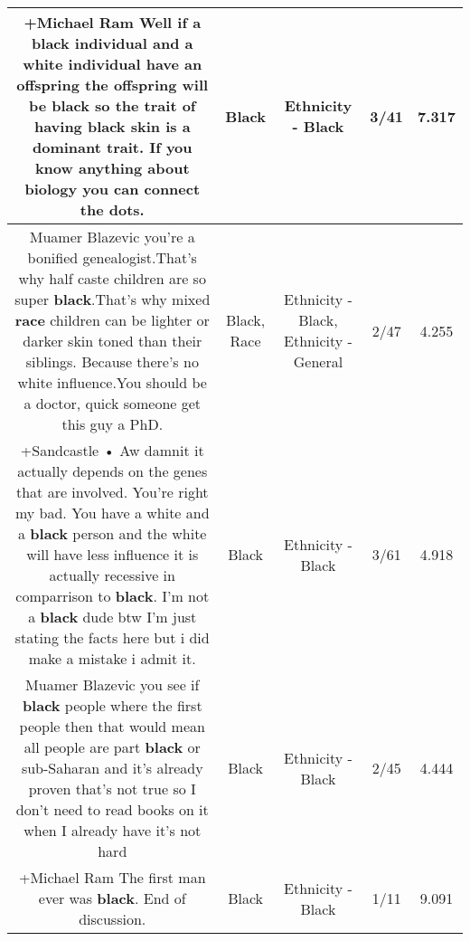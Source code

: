 \documentclass[11pt]{article}
\newlength\mylength
\begin{document}
\begin{center}
\begin{longtable}{|C{.65\mylength}|C{.30\mylength}|C{.12\mylength}|C{.12\mylength}|C{.12\mylength}|}
  \small +Michael Ram Well if a \textbf{black} individual and a white individual have an offspring the offspring will be \textbf{black} so the trait of having \textbf{black} skin is a dominant trait. If you know anything about biology you can connect the dots.\normalsize   & Black & Ethnicity - Black & 3/41 & 7.317 \\  \hline
  \small Muamer Blazevic you're a bonified genealogist.That's why half caste children are so super \textbf{black}.That's why mixed \textbf{race} children can be lighter or darker skin toned than their siblings. Because there's no white influence.You should be a doctor, quick someone get this guy a PhD.\normalsize   & Black, Race & Ethnicity - Black, Ethnicity - General & 2/47 & 4.255 \\  \hline
  \small +Sandcastle • Aw damnit it actually depends on the genes that are involved. You're right my bad. You have a white and a \textbf{black} person and the white will have less influence it is actually recessive in comparrison to \textbf{black}. I'm not a \textbf{black} dude btw I'm just stating the facts here but i did make a mistake i admit it.\normalsize   & Black & Ethnicity - Black & 3/61 & 4.918 \\  \hline
  \small Muamer Blazevic you see if \textbf{black} people where the first people then that would mean all people are part \textbf{black} or sub-Saharan and it's already proven that's not true so I don't need to read books on it when I already have it's not hard\normalsize   & Black & Ethnicity - Black & 2/45 & 4.444 \\  \hline
  \small +Michael Ram The first man ever was \textbf{black}. End of discussion.\normalsize   & Black & Ethnicity - Black & 1/11 & 9.091 \\  \hline

\end{longtable}
\end{center}
\end{document}
